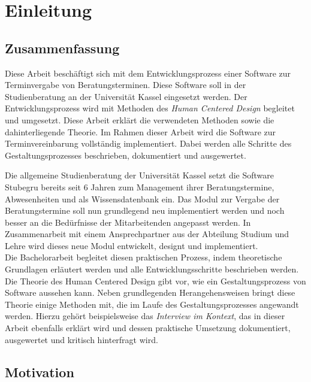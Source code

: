 \chapter{Einleitung}
\label{chapter:introduction}

\section{Zusammenfassung}
Diese Arbeit beschäftigt sich mit dem Entwicklungsprozess einer Software zur
Terminvergabe von Beratungsterminen. Diese Software soll in der Studienberatung
an der Universität Kassel eingesetzt werden. Der Entwicklungsprozess wird mit
Methoden des \textit{Human Centered Design} begleitet und umgesetzt. Diese
Arbeit erklärt die verwendeten Methoden sowie die dahinterliegende Theorie. Im
Rahmen dieser Arbeit wird die Software zur Terminvereinbarung vollständig
implementiert. Dabei werden alle Schritte des Gestaltungsprozesses beschrieben,
dokumentiert und ausgewertet.

Die allgemeine Studienberatung der Universität Kassel setzt die Software
Stubegru bereits seit 6 Jahren zum Management ihrer Beratungstermine,
Abwesenheiten und als Wissensdatenbank ein. Das Modul zur Vergabe der
Beratungstermine soll nun grundlegend neu implementiert werden und noch besser
an die Bedürfnisse der Mitarbeitenden angepasst werden. In Zusammenarbeit mit
einem Ansprechpartner aus der Abteilung Studium und Lehre wird dieses neue
Modul entwickelt, designt und implementiert.\\ Die Bachelorarbeit begleitet
diesen praktischen Prozess, indem theoretische Grundlagen erläutert werden und
alle Entwicklungsschritte beschrieben werden. Die Theorie des Human Centered
Design gibt vor, wie ein Gestaltungsprozess von Software aussehen kann. Neben
grundlegenden Herangehensweisen bringt diese Theorie einige Methoden mit, die
im Laufe des Gestaltungsprozesses angewandt werden. Hierzu gehört
beispielsweise das \textit{Interview im Kontext}, das in dieser Arbeit
ebenfalls erklärt wird und dessen praktische Umsetzung dokumentiert,
ausgewertet und kritisch hinterfragt wird.

\section{Motivation}

